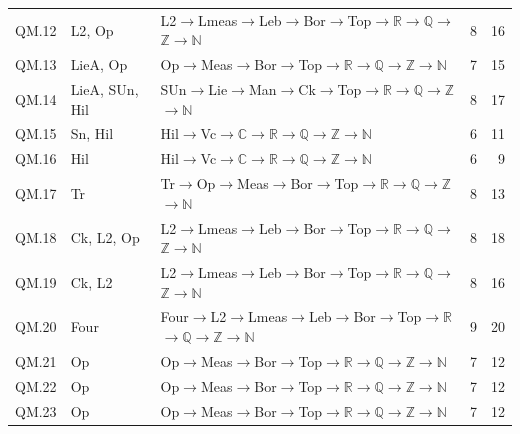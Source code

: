 {\begin{longtable}{l p{4.6cm} p{7.4cm} r r}
QM.12 & \textsf{L2}, \textsf{Op} & \textsf{L2}$\to$\textsf{Lmeas}$\to$\textsf{Leb}$\to$\textsf{Bor}$\to$\textsf{Top}$\to$$\mathbb R$$\to$$\mathbb Q$$\to$$\mathbb Z$$\to$$\mathbb N$ & 8 & 16 \\
QM.13 & \textsf{LieA}, \textsf{Op} & \textsf{Op}$\to$\textsf{Meas}$\to$\textsf{Bor}$\to$\textsf{Top}$\to$$\mathbb R$$\to$$\mathbb Q$$\to$$\mathbb Z$$\to$$\mathbb N$ & 7 & 15 \\
QM.14 & \textsf{LieA}, \textsf{SUn}, \textsf{Hil} & \textsf{SUn}$\to$\textsf{Lie}$\to$\textsf{Man}$\to$\textsf{Ck}$\to$\textsf{Top}$\to$$\mathbb R$$\to$$\mathbb Q$$\to$$\mathbb Z$$\to$$\mathbb N$ & 8 & 17 \\
QM.15 & \textsf{Sn}, \textsf{Hil} & \textsf{Hil}$\to$\textsf{Vc}$\to$$\mathbb C$$\to$$\mathbb R$$\to$$\mathbb Q$$\to$$\mathbb Z$$\to$$\mathbb N$ & 6 & 11 \\
QM.16 & \textsf{Hil} & \textsf{Hil}$\to$\textsf{Vc}$\to$$\mathbb C$$\to$$\mathbb R$$\to$$\mathbb Q$$\to$$\mathbb Z$$\to$$\mathbb N$ & 6 & 9 \\
QM.17 & \textsf{Tr} & \textsf{Tr}$\to$\textsf{Op}$\to$\textsf{Meas}$\to$\textsf{Bor}$\to$\textsf{Top}$\to$$\mathbb R$$\to$$\mathbb Q$$\to$$\mathbb Z$$\to$$\mathbb N$ & 8 & 13 \\
QM.18 & \textsf{Ck}, \textsf{L2}, \textsf{Op} & \textsf{L2}$\to$\textsf{Lmeas}$\to$\textsf{Leb}$\to$\textsf{Bor}$\to$\textsf{Top}$\to$$\mathbb R$$\to$$\mathbb Q$$\to$$\mathbb Z$$\to$$\mathbb N$ & 8 & 18 \\
QM.19 & \textsf{Ck}, \textsf{L2} & \textsf{L2}$\to$\textsf{Lmeas}$\to$\textsf{Leb}$\to$\textsf{Bor}$\to$\textsf{Top}$\to$$\mathbb R$$\to$$\mathbb Q$$\to$$\mathbb Z$$\to$$\mathbb N$ & 8 & 16 \\
QM.20 & \textsf{Four} & \textsf{Four}$\to$\textsf{L2}$\to$\textsf{Lmeas}$\to$\textsf{Leb}$\to$\textsf{Bor}$\to$\textsf{Top}$\to$$\mathbb R$$\to$$\mathbb Q$$\to$$\mathbb Z$$\to$$\mathbb N$ & 9 & 20 \\
QM.21 & \textsf{Op} & \textsf{Op}$\to$\textsf{Meas}$\to$\textsf{Bor}$\to$\textsf{Top}$\to$$\mathbb R$$\to$$\mathbb Q$$\to$$\mathbb Z$$\to$$\mathbb N$ & 7 & 12 \\
QM.22 & \textsf{Op} & \textsf{Op}$\to$\textsf{Meas}$\to$\textsf{Bor}$\to$\textsf{Top}$\to$$\mathbb R$$\to$$\mathbb Q$$\to$$\mathbb Z$$\to$$\mathbb N$ & 7 & 12 \\
QM.23 & \textsf{Op} & \textsf{Op}$\to$\textsf{Meas}$\to$\textsf{Bor}$\to$\textsf{Top}$\to$$\mathbb R$$\to$$\mathbb Q$$\to$$\mathbb Z$$\to$$\mathbb N$ & 7 & 12 \\

\end{longtable}}
